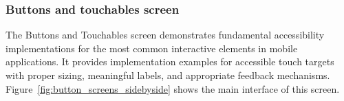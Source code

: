 \subsubsection{Buttons and touchables screen}
\label{subsubsec:buttons-touchables}

The Buttons and Touchables screen demonstrates fundamental accessibility implementations for the most common interactive elements in mobile applications. It provides implementation examples for accessible touch targets with proper sizing, meaningful labels, and appropriate feedback mechanisms. Figure~\ref{fig:button_screens_sidebyside} shows the main interface of this screen.

\begin{figure}[ht]
    \centering
    \begin{subfigure}[b]{0.48\textwidth}
        \centering

\end{subfigure}
\end{figure}
